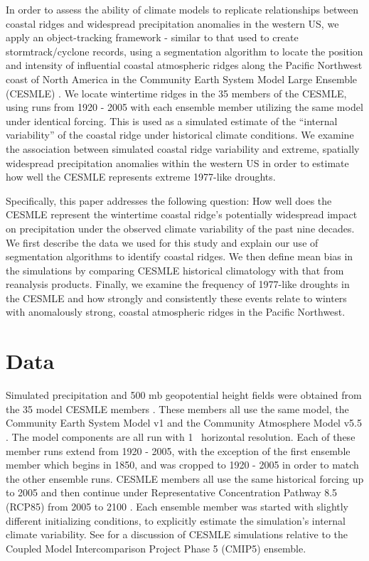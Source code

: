 \documentclass[final, double]{ua-thesis}
\begin{document}
In order to assess the ability of climate models to replicate relationships between coastal ridges and widespread precipitation anomalies in the western US, we apply an object-tracking framework - similar to that used to create stormtrack/cyclone records, using a segmentation algorithm to locate the position and intensity of influential coastal atmospheric ridges along the Pacific Northwest coast of North America in the Community Earth System Model Large Ensemble (CESMLE) \citep{3kay_community_2014}. We locate wintertime ridges in the 35 members of the CESMLE, using runs from 1920 - 2005 with each ensemble member utilizing the same model under identical forcing. This is used as a simulated estimate of the ``internal variability'' of the coastal ridge under historical climate conditions. We examine the association between simulated coastal ridge variability and extreme, spatially widespread precipitation anomalies within the western US in order to estimate how well the CESMLE represents extreme 1977-like droughts.

Specifically, this paper addresses the following question: How well does the CESMLE represent the wintertime coastal ridge's potentially widespread impact on precipitation under the observed climate variability of the past nine decades. We first describe the data we used for this study and explain our use of segmentation algorithms to identify coastal ridges. We then define mean bias in the simulations by comparing CESMLE historical climatology with that from reanalysis products. Finally, we examine the frequency of 1977-like droughts in the CESMLE and how strongly and consistently these events relate to winters with anomalously strong, coastal atmospheric ridges in the Pacific Northwest.

\section{Data}


Simulated precipitation and 500 mb geopotential height fields were obtained from the 35 model CESMLE members \citep{3kay_community_2014}. These members all use the same model, the Community Earth System Model v1 and the Community Atmosphere Model v5.5 \citep{3hurrell_community_2013}. The model components are all run with 1\textdegree~ horizontal resolution. Each of these member runs extend from 1920 - 2005, with the exception of the first ensemble member which begins in 1850, and was cropped to 1920 - 2005 in order to match the other ensemble runs. CESMLE members all use the same historical forcing up to 2005 and then continue under Representative Concentration Pathway 8.5 (RCP85) from 2005 to 2100 \citep{3kay_community_2014}. Each ensemble member was started with slightly different initializing conditions, to explicitly estimate the simulation's internal climate variability. See \citet{3kay_community_2014} for a discussion of CESMLE simulations relative to the Coupled Model Intercomparison Project Phase 5 (CMIP5) ensemble.
\end{document}

